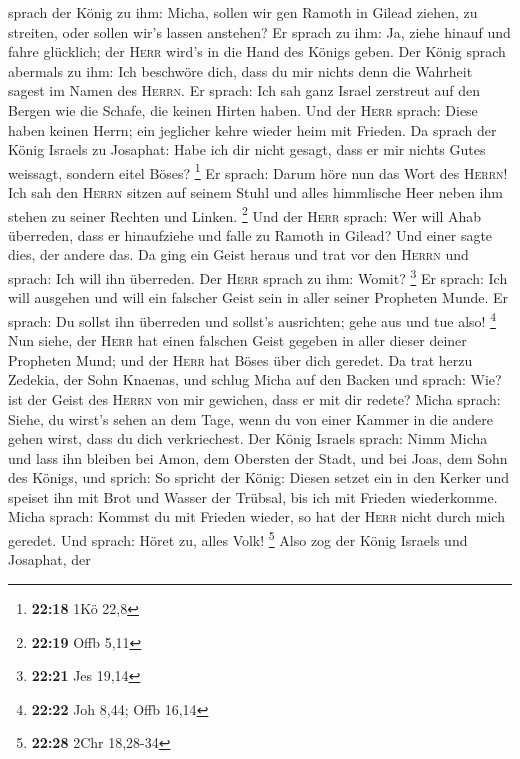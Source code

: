 sprach der König zu ihm: Micha, sollen wir gen Ramoth in Gilead ziehen,
zu streiten, oder sollen wir's lassen anstehen? Er sprach zu ihm: Ja,
ziehe hinauf und fahre glücklich; der \textsc{Herr} wird's in die Hand
des Königs geben.  Der König sprach abermals zu ihm: Ich
beschwöre dich, dass du mir nichts denn die Wahrheit sagest im Namen des
\textsc{Herrn}.  Er sprach: Ich sah ganz Israel zerstreut
auf den Bergen wie die Schafe, die keinen Hirten haben. Und der
\textsc{Herr} sprach: Diese haben keinen Herrn; ein jeglicher kehre
wieder heim mit Frieden.  Da sprach der König Israels zu
Josaphat: Habe ich dir nicht gesagt, dass er mir nichts Gutes weissagt,
sondern eitel Böses? \footnote{\textbf{22:18} 1Kö 22,8} 
Er sprach: Darum höre nun das Wort des \textsc{Herrn}! Ich sah den
\textsc{Herrn} sitzen auf seinem Stuhl und alles himmlische Heer neben
ihm stehen zu seiner Rechten und Linken. \footnote{\textbf{22:19} Offb
  5,11}  Und der \textsc{Herr} sprach: Wer will Ahab
überreden, dass er hinaufziehe und falle zu Ramoth in Gilead? Und einer
sagte dies, der andere das.  Da ging ein Geist heraus und
trat vor den \textsc{Herrn} und sprach: Ich will ihn überreden. Der
\textsc{Herr} sprach zu ihm: Womit? \footnote{\textbf{22:21} Jes 19,14}
 Er sprach: Ich will ausgehen und will ein falscher Geist
sein in aller seiner Propheten Munde. Er sprach: Du sollst ihn überreden
und sollst's ausrichten; gehe aus und tue also! \footnote{\textbf{22:22}
  Joh 8,44; Offb 16,14}  Nun siehe, der \textsc{Herr} hat
einen falschen Geist gegeben in aller dieser deiner Propheten Mund; und
der \textsc{Herr} hat Böses über dich geredet.  Da trat
herzu Zedekia, der Sohn Knaenas, und schlug Micha auf den Backen und
sprach: Wie? ist der Geist des \textsc{Herrn} von mir gewichen, dass er
mit dir redete?  Micha sprach: Siehe, du wirst's sehen an
dem Tage, wenn du von einer Kammer in die andere gehen wirst, dass du
dich verkriechest.  Der König Israels sprach: Nimm Micha
und lass ihn bleiben bei Amon, dem Obersten der Stadt, und bei Joas, dem
Sohn des Königs,  und sprich: So spricht der König:
Diesen setzet ein in den Kerker und speiset ihn mit Brot und Wasser der
Trübsal, bis ich mit Frieden wiederkomme.  Micha sprach:
Kommst du mit Frieden wieder, so hat der \textsc{Herr} nicht durch mich
geredet. Und sprach: Höret zu, alles Volk! \footnote{\textbf{22:28} 2Chr
  18,28-34}  Also zog der König Israels und Josaphat, der
